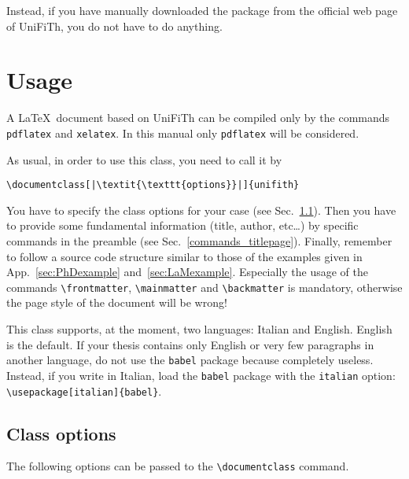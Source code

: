 \documentclass[a5paper,11pt]{article}
\newcommand{\bs}{\textbackslash}
\begin{document}
Instead, if you have manually downloaded the package from the official web page of \textsf{UniFiTh}, you do not have to do anything.

\section{Usage}

A \LaTeX\ document based on \textsf{UniFiTh} can be compiled only by the commands
\texttt{pdflatex} and \texttt{xelatex}. In this manual only \texttt{pdflatex} will be considered.


As usual, in order to use this class, you need to call it by
\begin{lstlisting}
\documentclass[|\textit{\texttt{options}}|]{unifith}
\end{lstlisting}
You have to specify the class options for your case (see Sec.~\ref{class_options}). Then you have to provide some fundamental information (title, author, etc\ldots) by specific commands in the preamble (see Sec.~\ref{commands_titlepage}). Finally, remember to follow a source code structure similar to those of the examples given in App.~\ref{sec:PhDexample} and~\ref{sec:LaMexample}.
Especially the usage of the commands \texttt{\bs frontmatter}, \texttt{\bs mainmatter} and \texttt{\bs backmatter} is mandatory, otherwise the page style of the document will be wrong!

This class supports, at the moment, two languages: Italian and English. English is the default.
If your thesis contains only English or very few paragraphs in another language, do not use the \texttt{babel} package because completely useless. Instead, if you write in Italian, load the \texttt{babel} package with the
\texttt{italian} option: \texttt{\bs usepackage[italian]\{babel\}}.

\subsection{Class options}
\label{class_options}
The following options can be passed to the \texttt{\bs documentclass} command.
\end{document}

